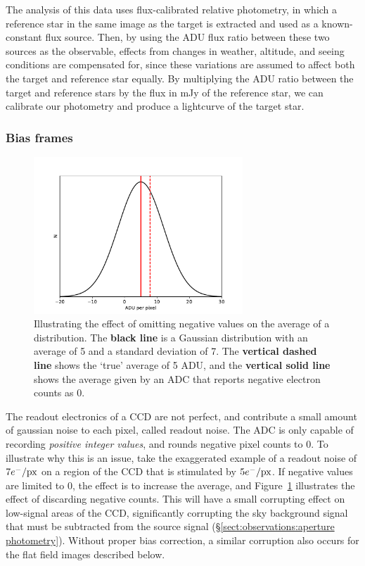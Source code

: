 The analysis of this data uses flux-calibrated relative photometry, in which a reference star in the same image as the target is extracted and used as a known-constant flux source. Then, by using the ADU flux ratio between these two sources as the observable, effects from changes in weather, altitude, and seeing conditions are compensated for, since these variations are assumed to affect both the target and reference star equally. By multiplying the ADU ratio between the target and reference stars by the flux in mJy of the reference star, we can calibrate our photometry and produce a lightcurve of the target star.


\subsubsection{Bias frames}
\label{sect:observations:bias frames}

\begin{figure}
    \centering
    \includegraphics[width=0.7\textwidth]{figures/observations/bias_frame_histogram.pdf}
    \caption{Illustrating the effect of omitting negative values on the average of a distribution. The {\bf black line} is a Gaussian distribution with an average of 5 and a standard deviation of 7. The {\bf vertical dashed line} shows the `true' average of 5 ADU, and the {\bf vertical solid line} shows the average given by an ADC that reports negative electron counts as 0.}
    \label{fig:observations:bias frame histogram}
\end{figure}
The readout electronics of a CCD are not perfect, and contribute a small amount of gaussian noise to each pixel, called readout noise. The ADC is only capable of recording {\it positive integer values}, and rounds negative pixel counts to 0. To illustrate why this is an issue, take the exaggerated example of a readout noise of $7 e^-/{\rm px}$ on a region of the CCD that is stimulated by $5 e^-/{\rm px}$. If negative values are limited to 0, the effect is to increase the average, and Figure~\ref{fig:observations:bias frame histogram} illustrates the effect of discarding negative counts.
This will have a small corrupting effect on low-signal areas of the CCD, significantly corrupting the sky background signal that must be subtracted from the source signal (\S\ref{sect:observations:aperture photometry}). Without proper bias correction, a similar corruption also occurs for the flat field images described below.

